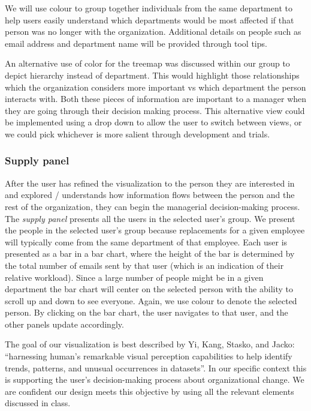 \documentclass[12pt,letterpaper]{article}
\begin{document}
We will use colour to group together individuals from the same department to help users easily understand which departments would be most affected if that person was no longer with the organization.  Additional details on people\cite{anafigueiras} such as email address and department name will be provided through tool tips. 

An alternative use of color for the treemap was discussed within our group to depict hierarchy instead of department.  This would highlight those relationships which the organization considers more important vs which department the person interacts with.  Both these pieces of information are important to a manager when they are going through their decision making process.  This alternative view could be implemented using a drop down to allow the user to switch between views, or we could pick whichever is more salient through development and trials.

\subsubsection{Supply panel}

After the user has refined the visualization to the person they are interested in and explored / understands how information flows between the person and the rest of the organization, they can begin the managerial decision-making process. The \emph{supply panel} presents all the users in the selected user's group. We present the people in the selected user's group because replacements for a given employee will typically come from the same department of that employee. Each user is presented as a bar in a bar chart, where the height of the bar is determined by the total number of emails sent by that user (which is an indication of their relative workload). Since a large number of people might be in a given department the bar chart will center on the selected person with the ability to scroll up and down to see everyone.  Again, we use colour to denote the selected person.  By clicking on the bar chart, the user navigates to that user, and the other panels update accordingly.

The goal of our visualization is best described by Yi, Kang, Stasko, and Jacko: “harnessing human’s remarkable visual perception capabilities to help identify trends, patterns, and unusual occurrences in datasets”\cite{yi2007toward}.  In our specific context this is supporting the user’s decision-making process about organizational change.  We are confident our design meets this objective by using all the relevant elements discussed in class.
\end{document}

